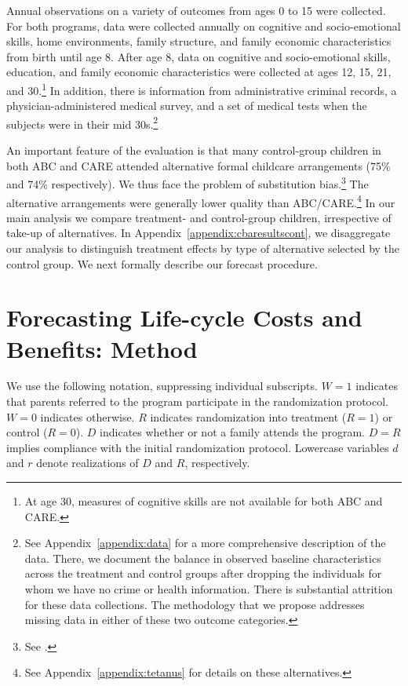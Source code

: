 Annual observations on a variety of outcomes from ages 0 to 15 were collected. For both programs, data were collected annually on cognitive and socio-emotional skills, home environments, family structure, and family economic characteristics from birth until age 8. After age 8, data on cognitive and socio-emotional skills, education, and family economic characteristics were collected at ages 12, 15, 21, and 30.\footnote{At age 30, measures of cognitive skills are not available for both ABC and CARE.} In addition, there is information from administrative criminal records, a physician-administered medical survey, and a set of medical tests when the subjects were in their mid 30s.\footnote{See  Appendix~\ref{appendix:data} for a more comprehensive description of the data. There, we document the balance in observed baseline characteristics across the treatment and control groups after dropping the individuals for whom we have no crime or health information. There is substantial attrition for these data collections. The methodology that we propose addresses missing data in either of these two outcome categories.}

An important feature of the evaluation is that many control-group children in both ABC and CARE attended alternative formal childcare arrangements (75\% and 74\% respectively). We thus face the problem of substitution bias.\footnote{See \citet{Heckman_1992_randomization,Heckman_Hohmann_etal_2000_QJE,Kline_Walters_2016_QJE}.} The alternative arrangements were generally lower quality than ABC/CARE.\footnote{See Appendix~\ref{appendix:tetanus} for details on these alternatives.} In our main analysis we compare treatment- and control-group children, irrespective of take-up of alternatives. In Appendix~\ref{appendix:cbaresultscont}, we disaggregate our analysis to distinguish treatment effects by type of alternative selected by the control group. We next formally describe our forecast procedure.

\section{Forecasting Life-cycle Costs and Benefits: Method} \label{section:cbamethodology}

We use the following notation, suppressing individual subscripts. $W=1$ indicates that parents referred to the program participate in the randomization protocol. $W=0$ indicates otherwise. $R$ indicates randomization into treatment ($R = 1$) or control ($R = 0$). $D$ indicates whether or not a family attends the program. $D = R$ implies compliance with the initial randomization protocol. Lowercase variables $d$ and $r$ denote realizations of $D$ and $R$, respectively.

